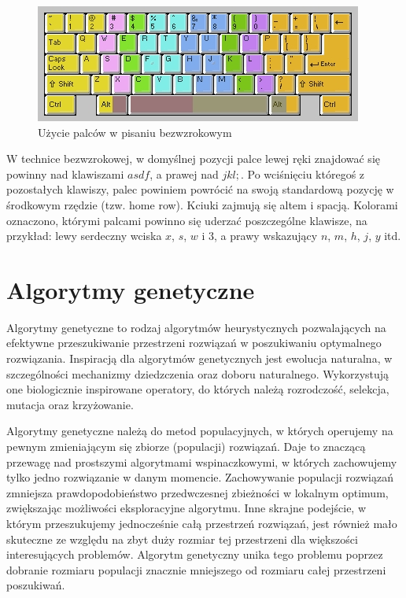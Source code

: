 \documentclass[brudnopis]{xmgr}
\begin{document}
\begin{figure}[!tbh]
\centering
\includegraphics[width=.8\hsize]{fig/touchtyping}
\caption{Użycie palców w pisaniu bezwzrokowym}
\end{figure}

W technice bezwzrokowej, w domyślnej pozycji palce lewej ręki znajdować się powinny nad klawiszami $asdf$, a prawej nad $jkl;$. Po wciśnięciu któregoś z pozostałych klawiszy, palec powiniem powrócić na swoją standardową pozycję w środkowym rzędzie (tzw. home row). Kciuki zajmują się altem i spacją. Kolorami oznaczono, którymi palcami powinno się uderzać poszczególne klawisze, na przykład: lewy serdeczny wciska $x$, $s$, $w$ i $3$, a prawy wskazujący $n$, $m$, $h$, $j$, $y$ itd.


\chapter{Algorytmy genetyczne}

Algorytmy genetyczne to rodzaj algorytmów heurystycznych pozwalających na efektywne przeszukiwanie przestrzeni rozwiązań w poszukiwaniu optymalnego rozwiązania. Inspiracją dla algorytmów genetycznych jest ewolucja naturalna, w szczególności mechanizmy dziedzczenia oraz doboru naturalnego. Wykorzystują one biologicznie inspirowane operatory, do których należą rozrodczość, selekcja, mutacja oraz krzyżowanie.

Algorytmy genetyczne należą do metod populacyjnych, w których operujemy na pewnym zmieniającym się zbiorze (populacji) rozwiązań. Daje to znaczącą przewagę nad prostszymi algorytmami wspinaczkowymi, w których zachowujemy tylko jedno rozwiązanie w danym momencie. Zachowywanie populacji rozwiązań zmniejsza prawdopodobieństwo przedwczesnej zbieżności w lokalnym optimum, zwiększając możliwości eksploracyjne algorytmu. Inne skrajne podejście, w którym przeszukujemy jednocześnie całą przestrzeń rozwiązań, jest również mało skuteczne ze względu na zbyt duży rozmiar tej przestrzeni dla większości interesujących problemów. Algorytm genetyczny unika tego problemu poprzez dobranie rozmiaru populacji znacznie mniejszego od rozmiaru całej przestrzeni poszukiwań.
\end{document}
